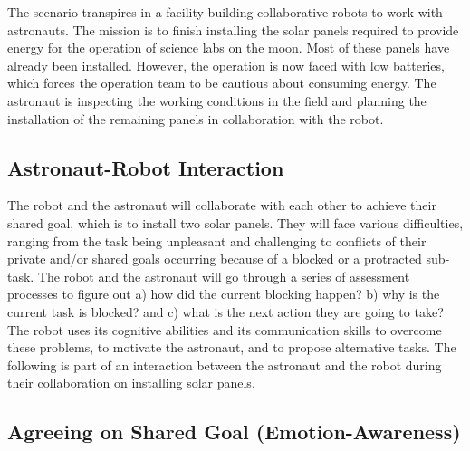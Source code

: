The scenario transpires in a facility building collaborative robots to work with
astronauts. The mission is to finish installing the solar panels required to
provide energy for the operation of science labs on the moon. Most of these
panels have already been installed. However, the operation is now faced with low
batteries, which forces the operation team to be cautious about consuming
energy. The astronaut is inspecting the working conditions in the field and
planning the installation of the remaining panels in collaboration with the
robot.

\subsection{Astronaut-Robot Interaction}

The robot and the astronaut will collaborate with each other to achieve their
shared goal, which is to install two solar panels. They will face various
difficulties, ranging from the task being unpleasant and challenging to
conflicts of their private and/or shared goals occurring because of a blocked or
a protracted sub-task. The robot and the astronaut will go through a series of
assessment processes to figure out a) how did the current blocking happen? b)
why is the current task is blocked? and c) what is the next action they are
going to take? The robot uses its cognitive abilities and its communication
skills to overcome these problems, to motivate the astronaut, and to propose
alternative tasks. The following is part of an interaction between the astronaut
and the robot during their collaboration on installing solar panels.

\subsection{Agreeing on Shared Goal (Emotion-Awareness)}
\label{sec:exp1}

